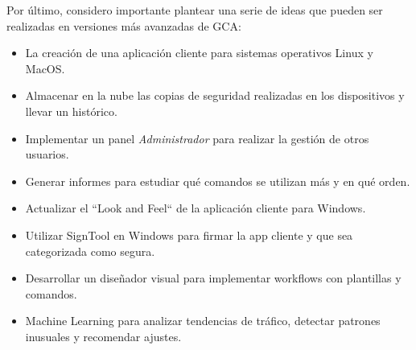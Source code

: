 Por último, considero importante plantear una serie de ideas que pueden ser realizadas en versiones más avanzadas de GCA:
\begin{itemize}
    \item La creación de una aplicación cliente para sistemas operativos Linux y MacOS.
    \item Almacenar en la nube las copias de seguridad realizadas en los dispositivos y llevar un histórico.
    \item Implementar un panel \textit{Administrador} para realizar la gestión de otros usuarios.
    \item Generar informes para estudiar qué comandos se utilizan más y en qué orden.
    \item Actualizar el ``Look and Feel`` de la aplicación cliente para Windows.
    \item Utilizar SignTool en Windows para firmar la app cliente y que sea categorizada como segura.
    \item Desarrollar un diseñador visual para implementar workflows con plantillas y comandos.
    \item Machine Learning para analizar tendencias de tráfico, detectar patrones inusuales y recomendar ajustes.
\end{itemize}